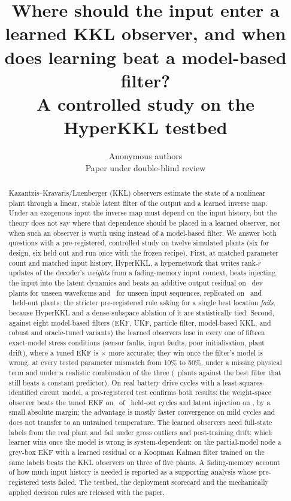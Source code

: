 \documentclass{article}
\title{Where should the input enter a learned KKL observer, and when does learning beat a model-based filter?\\ \large A controlled study on the HyperKKL testbed}
\author{\name Anonymous authors \email \\
      \addr Paper under double-blind review}
\theoremstyle{definition}
\begin{document}
\maketitle

\begin{abstract}
Kazantzis--Kravaris/Luenberger (KKL) observers estimate the state of a nonlinear plant through a linear, stable latent filter of the output and a learned inverse map. Under an exogenous input the inverse map must depend on the input history, but the theory does not say where that dependence should be placed in a learned observer, nor when such an observer is worth using instead of a model-based filter. We answer both questions with a pre-registered, controlled study on twelve simulated plants (six for design, six held out and run once with the frozen recipe). First, at matched parameter count and matched input history, HyperKKL, a hypernetwork that writes rank-$r$ updates of the decoder's \emph{weights} from a fading-memory input context, beats injecting the input into the latent dynamics and beats an additive output residual on \ConeWeightSpaceBeatsLatConcShape\ dev plants for unseen waveforms and \ConeWeightSpaceBeatsLatConcSeq\ for unseen input sequences, replicated on \CtestWeightSpaceBeatsLatConcShape\ and \CtestWeightSpaceBeatsLatConcSeq\ held-out plants; the stricter pre-registered rule asking for a single best location \emph{fails}, because HyperKKL and a dense-subspace ablation of it are statistically tied. Second, against eight model-based filters (EKF, UKF, particle filter, model-based KKL, and robust and oracle-tuned variants) the learned observers lose in every one of fifteen exact-model stress conditions (sensor faults, input faults, poor initialisation, plant drift), where a tuned EKF is \ConeLearnedOverEkfMedianSeq$\times$ more accurate; they win once the filter's model is wrong, at every tested parameter mismatch from 10\% to 50\%, under a missing physical term and under a realistic combination of the three (\CthreeRealisticSeqVsWorking\ plants against the best filter that still beats a constant predictor). On real battery drive cycles with a least-squares-identified circuit model, a pre-registered test confirms both results: the weight-space observer beats the tuned EKF on \RealHOneLearnedBetter\ of \RealNTestCycles\ held-out cycles and latent injection on \RealHTwoWsBetter, by a small absolute margin; the advantage is mostly faster convergence on mild cycles and does not transfer to an untrained temperature. The learned observers need full-state labels from the real plant and fail under gross outliers and post-training drift; which learner wins once the model is wrong is system-dependent: on the partial-model node a grey-box EKF with a learned residual or a Koopman Kalman filter trained on the same labels beats the KKL observers on three of five plants. A fading-memory account of how much input history is needed is reported as a supporting analysis whose pre-registered tests failed. The testbed, the deployment scorecard and the mechanically applied decision rules are released with the paper.
\end{abstract}
\end{document}
